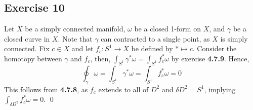 \documentclass{article}
\begin{document}
  \subsection*{Exercise 10}
    Let $X$ be a simply connected manifold, $\omega$ be a closed 1-form on $X$,
    and $\gamma$ be a closed curve in $X$. Note that $\gamma$ can contracted to
    a single point, as $X$ is simply connected. Fix $c\in X$ and let $f_c\colon
    S^1\to X$ be defined by $*\mapsto c$. Consider the homotopy between $\gamma$
    and $f_c$, then, $\int_{S^1}\gamma^*\omega=\int_{S^1}f_c^*\omega$ by
    exercise \textbf{4.7.9}. Hence,
    \begin{equation*}
      \oint_\gamma\omega
        =\int_{S^1}\gamma^*\omega
        =\int_{S^1}f_c^*\omega
        = 0
    \end{equation*}
    This follows from \textbf{4.7.8}, as $f_c$ extends to all of $D^2$ and
    $\delta D^2=S^1$, implying $\int_{\delta D^2}f_c^*\omega=0$.
    \qed
\end{document}
